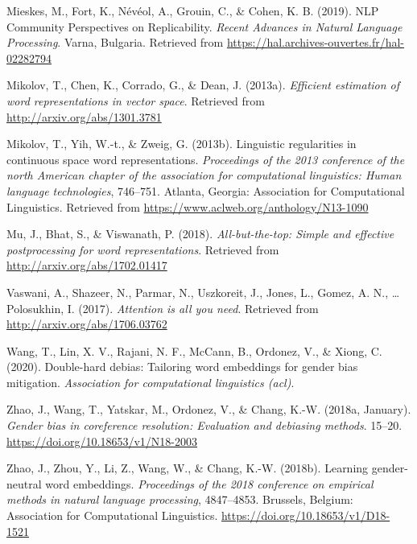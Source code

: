 \documentclass[
  english,
  man,floatsintext]{apa6}
\begin{document}
\leavevmode\hypertarget{ref-mieskes_2019}{}%
Mieskes, M., Fort, K., Névéol, A., Grouin, C., \& Cohen, K. B. (2019). NLP Community Perspectives on Replicability. \emph{Recent Advances in Natural Language Processing}. Varna, Bulgaria. Retrieved from \url{https://hal.archives-ouvertes.fr/hal-02282794}

\leavevmode\hypertarget{ref-mikolov2013Google}{}%
Mikolov, T., Chen, K., Corrado, G., \& Dean, J. (2013a). \emph{Efficient estimation of word representations in vector space}. Retrieved from \url{http://arxiv.org/abs/1301.3781}

\leavevmode\hypertarget{ref-mikolov2013MSR}{}%
Mikolov, T., Yih, W.-t., \& Zweig, G. (2013b). Linguistic regularities in continuous space word representations. \emph{Proceedings of the 2013 conference of the north American chapter of the association for computational linguistics: Human language technologies}, 746--751. Atlanta, Georgia: Association for Computational Linguistics. Retrieved from \url{https://www.aclweb.org/anthology/N13-1090}

\leavevmode\hypertarget{ref-mu_2018}{}%
Mu, J., Bhat, S., \& Viswanath, P. (2018). \emph{All-but-the-top: Simple and effective postprocessing for word representations}. Retrieved from \url{http://arxiv.org/abs/1702.01417}

\leavevmode\hypertarget{ref-vaswani_2017}{}%
Vaswani, A., Shazeer, N., Parmar, N., Uszkoreit, J., Jones, L., Gomez, A. N., \ldots{} Polosukhin, I. (2017). \emph{Attention is all you need}. Retrieved from \url{http://arxiv.org/abs/1706.03762}

\leavevmode\hypertarget{ref-wang_2020}{}%
Wang, T., Lin, X. V., Rajani, N. F., McCann, B., Ordonez, V., \& Xiong, C. (2020). Double-hard debias: Tailoring word embeddings for gender bias mitigation. \emph{Association for computational linguistics (acl)}.

\leavevmode\hypertarget{ref-zhao_2018a}{}%
Zhao, J., Wang, T., Yatskar, M., Ordonez, V., \& Chang, K.-W. (2018a, January). \emph{Gender bias in coreference resolution: Evaluation and debiasing methods}. 15--20. \url{https://doi.org/10.18653/v1/N18-2003}

\leavevmode\hypertarget{ref-zhao_2018b}{}%
Zhao, J., Zhou, Y., Li, Z., Wang, W., \& Chang, K.-W. (2018b). Learning gender-neutral word embeddings. \emph{Proceedings of the 2018 conference on empirical methods in natural language processing}, 4847--4853. Brussels, Belgium: Association for Computational Linguistics. \url{https://doi.org/10.18653/v1/D18-1521}

\endgroup
\end{document}
